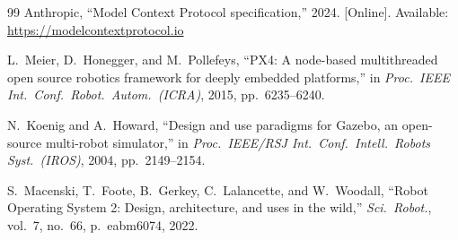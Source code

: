 \documentclass[journal]{IEEEtran}
\begin{document}
\begin{thebibliography}{99}
Anthropic, ``Model Context Protocol specification,'' 2024. [Online]. Available:
\url{https://modelcontextprotocol.io}

L.~Meier, D.~Honegger, and M.~Pollefeys, ``{PX4}: A node-based multithreaded open source robotics
framework for deeply embedded platforms,'' in \emph{Proc.\ IEEE Int.\ Conf.\ Robot.\ Autom.\
(ICRA)}, 2015, pp.~6235--6240.

N.~Koenig and A.~Howard, ``Design and use paradigms for {Gazebo}, an open-source multi-robot
simulator,'' in \emph{Proc.\ IEEE/RSJ Int.\ Conf.\ Intell.\ Robots Syst.\ (IROS)}, 2004,
pp.~2149--2154.

S.~Macenski, T.~Foote, B.~Gerkey, C.~Lalancette, and W.~Woodall, ``Robot {Operating System 2}:
Design, architecture, and uses in the wild,'' \emph{Sci.\ Robot.}, vol.~7, no.~66, p.~eabm6074,
2022.

\end{thebibliography}
\end{document}
